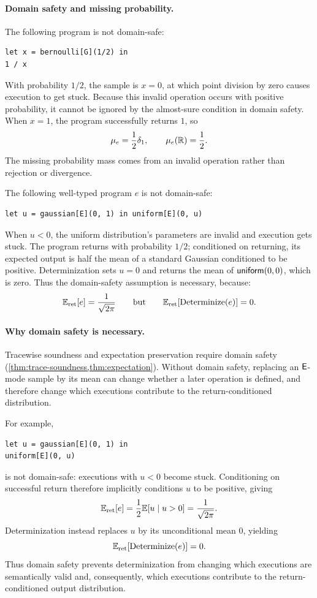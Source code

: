 \paragraph{Domain safety and missing probability.}
\begin{example}
The following program is not domain-safe:
\begin{lstlisting}
let x = bernoulli[G](1/2) in
1 / x
\end{lstlisting}
With probability $1/2$, the sample is $x=0$, at which point division by zero
causes execution to get stuck. Because this invalid operation occurs with
positive probability, it cannot be ignored by the almost-sure condition in
domain safety. When $x=1$, the program successfully returns $1$, so
\[
  \mu_{e}=\frac12\delta_1,
  \qquad
  \mu_{e}(\mathbb{R})=\frac12.
\]
The missing probability mass comes from an invalid operation rather than
rejection or divergence.
\end{example}

\begin{example}
The following well-typed program $e$ is not domain-safe:
\begin{lstlisting}
let u = gaussian[E](0, 1) in uniform[E](0, u)
\end{lstlisting}
When $u<0$, the uniform distribution's parameters are invalid and execution gets
stuck. The program returns with probability $1/2$; conditioned on returning,
its expected output is half the mean of a standard Gaussian conditioned to be
positive. Determinization sets $u=0$ and returns the mean of
$\mathsf{uniform}(0,0)$, which is zero.
Thus the domain-safety assumption is necessary, because:
\[
 \mathbb{E}_{\mathrm{ret}}[e]=\frac{1}{\sqrt{2\pi}}
 \qquad\text{but}\qquad
 \mathbb{E}_{\mathrm{ret}}[\operatorname{Determinize}(e)]=0.
\]
\end{example}

\paragraph{Why domain safety is necessary.}
Tracewise soundness and expectation preservation require domain safety
(\cref{thm:trace-soundness,thm:expectation}). Without domain safety, replacing an $\mathsf{E}$-mode sample by its mean can change whether a later operation is defined, and therefore change which executions contribute to the return-conditioned distribution.

For example,
\begin{lstlisting}
let u = gaussian[E](0, 1) in
uniform[E](0, u)
\end{lstlisting}
is not domain-safe: executions with $u<0$ become stuck. Conditioning on successful return therefore implicitly conditions $u$ to be positive, giving
\[
\mathbb{E}_{\mathrm{ret}}[e]
=
\frac{1}{2}\mathbb{E}[u\mid u>0]
=
\frac{1}{\sqrt{2\pi}}.
\]
Determinization instead replaces $u$ by its unconditional mean $0$, yielding
\[
\mathbb{E}_{\mathrm{ret}}[\operatorname{Determinize}(e)]=0.
\]
Thus domain safety prevents determinization from changing which executions are semantically valid and, consequently, which executions contribute to the return-conditioned output distribution.


